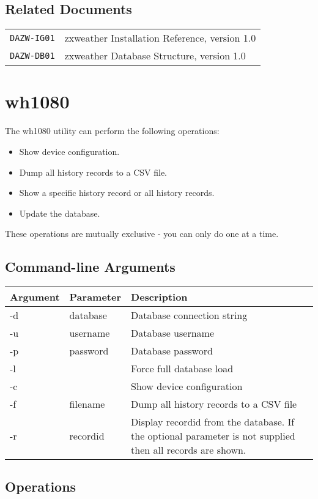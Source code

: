 \documentclass[a4paper,10pt,draft]{book}
\begin{document}
\section{Related Documents}
\begin{tabular}{l l}
\verb|DAZW-IG01| & zxweather Installation Reference, version 1.0 \\
\verb|DAZW-DB01| & zxweather Database Structure, version 1.0 \\
\end{tabular}

\chapter{wh1080}

The wh1080 utility can perform the following operations:
\begin{itemize}
\item Show device configuration.
\item Dump all history records to a CSV file.
\item Show a specific history record or all history records.
\item Update the database.
\end{itemize}
These operations are mutually exclusive - you can only do one at a time.

\section{Command-line Arguments}
\begin{tabular}{l l p{10cm}}
\hline
\textbf{Argument} & \textbf{Parameter} & \textbf{Description} \\
\hline
-d & database & Database connection string \\
-u & username & Database username \\
-p & password & Database password \\
-l &  & Force full database load \\
-c &  & Show device configuration \\
-f & filename & Dump all history records to a CSV file \\
-r & recordid & Display recordid from the database. If the optional parameter is not supplied then all records are shown. \\
\hline
\end{tabular}

\section{Operations}
\end{document}
